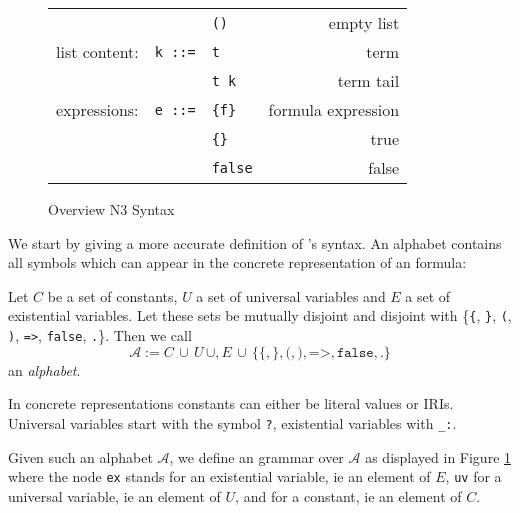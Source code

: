 \begin{figure}
\begin{tabular}{lllr}
&      & \texttt{()}& empty list \\
list content:&\texttt{k ::=}%
&\texttt{t}& term\\
&&\texttt{t k} & term tail\\
expressions:&\texttt{e ::=}%
       &\texttt{\{f\}} &               formula expression\\
&       &\texttt{\{\}} & true\\
&       &\texttt{false}       &               false\\
  \hline
\end{tabular}
\caption{Overview N3 Syntax \label{N3S}}
\end{figure}

We start by giving a more accurate definition of \nthree's syntax. An \nthree alphabet contains all symbols which can appear in the concrete representation of an \nthree formula:
\begin{definition} \label{alphabet}
Let $C$ be a set of constants, $U$ a set of universal variables and $E$ a set of existential variables. Let these sets be mutually disjoint and disjoint 
with \{\texttt{\{}, \texttt{\}}, \texttt{(}, \texttt{)}, \texttt{=>}, \texttt{false}, \texttt{.}\}.
Then we call
\[\mathcal{A}:=C \,\cup\, U \,\cup, E \,\cup\, \{\texttt{\{}, \texttt{\}}, \texttt{(}, \texttt{)}, \texttt{=>}, \texttt{false}, \texttt{.}\}\] an \emph{\nthree alphabet}. 
\end{definition}
%
In concrete representations constants can either be literal values or IRIs.
Universal variables start with the symbol \texttt{?}, existential variables with \texttt{\_:}. %

Given such an \nthree alphabet $\mathcal{A}$, we define an \nthree grammar over $\mathcal{A}$ as displayed  
in Figure \ref{N3S}
where the node \texttt{ex} stands for an existential variable, ie an element of $E$, \texttt{uv} for a universal variable, ie an element of $U$, and  for a constant, ie an 
element of $C$. 
%

